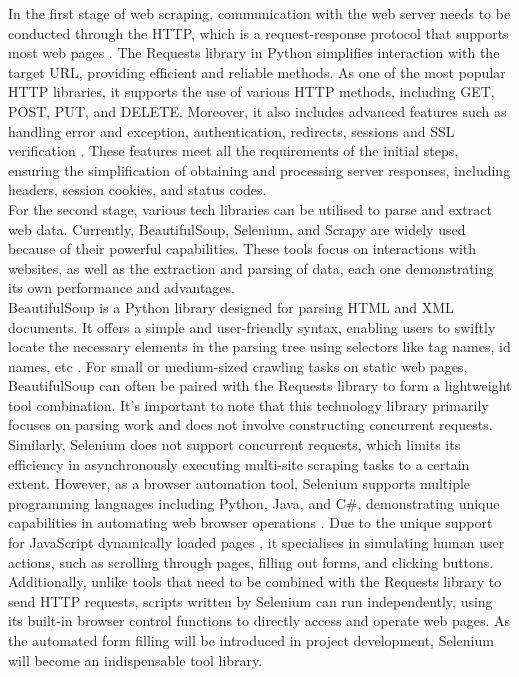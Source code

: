 \documentclass[ oneside,%
                    author={Cassie Qing Tang},
                    degree={BSc},
                     title={An Automated Response System for Disrupting Online Pet Scamming \\ },
                    subtitle={ }]{dissertation}
\begin{document}
In the first stage of web scraping, communication with the web server needs to be conducted through the HTTP, which is a request-response protocol that supports most web pages \cite{chandra_python_2015}. The Requests library in Python simplifies interaction with the target URL, providing efficient and reliable methods. As one of the most popular HTTP libraries, it supports the use of various HTTP methods, including GET, POST, PUT, and DELETE. Moreover, it also includes advanced features such as handling error and exception, authentication, redirects, sessions and SSL verification \cite{noauthor_requests_nodate}. These features meet all the requirements of the initial steps, ensuring the simplification of obtaining and processing server responses, including headers, session cookies, and status codes.
\\

For the second stage, various tech libraries can be utilised to parse and extract web data. Currently, BeautifulSoup, Selenium, and Scrapy are widely used because of their powerful capabilities. These tools focus on interactions with websites, as well as the extraction and parsing of data, each one demonstrating its own performance and advantages.
\\

BeautifulSoup is a Python library designed for parsing HTML and XML documents. It offers a simple and user-friendly syntax, enabling users to swiftly locate the necessary elements in the parsing tree using selectors like tag names, id names, etc \cite{chandra_python_2015}. For small or medium-sized crawling tasks on static web pages, BeautifulSoup can often be paired with the Requests library to form a lightweight tool combination. It's important to note that this technology library primarily focuses on parsing work and does not involve constructing concurrent requests.
\\

Similarly, Selenium does not support concurrent requests, which limits its efficiency in asynchronously executing multi-site scraping tasks to a certain extent. However, as a browser automation tool, Selenium supports multiple programming languages including Python, Java, and C\#, demonstrating unique capabilities in automating web browser operations \cite{fariha_beautifulsoup_2023}. Due to the unique support for JavaScript dynamically loaded pages \cite{fariha_beautifulsoup_2023}, it specialises in simulating human user actions, such as scrolling through pages, filling out forms, and clicking buttons. Additionally, unlike tools that need to be combined with the Requests library to send HTTP requests, scripts written by Selenium can run independently, using its built-in browser control functions to directly access and operate web pages. As the automated form filling will be introduced in project development, Selenium will become an indispensable tool library.
\\
\end{document}
